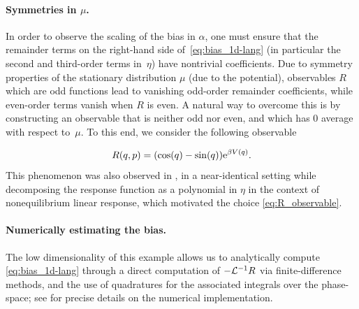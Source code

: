 %
\paragraph{Symmetries in $\mu$.}   In order to observe the scaling of the bias in $\alpha$, one must ensure that the remainder terms on the right-hand side of~\eqref{eq:bias_1d-lang} (in particular the second and third-order terms in~$\eta$) have nontrivial coefficients. Due to symmetry properties of the stationary distribution $\mu$ (due to the potential), observables $R$ which are odd functions lead to vanishing odd-order remainder coefficients, while even-order terms vanish when $R$ is even. A natural way to overcome this is by constructing an observable that is neither odd nor even, and which has 0 average with respect to~$\mu$. To this end, we consider the following observable

\begin{equation}
	R(q,p) = \paren*{\cos(q) - \sin(q)} \e^{\beta V(q)}.
	\label{eq:R_observable}
\end{equation}
%
This phenomenon was also observed in \cite[Section 4.2]{synthetic2023}, in a near-identical setting while decomposing the response function as a polynomial in $\eta$ in the context of nonequilibrium linear response, which motivated the choice \eqref{eq:R_observable}.

\paragraph{Numerically estimating the bias.} The low dimensionality of this example allows us to analytically compute \eqref{eq:bias_1d-lang} through a direct computation of $-\mathcal{L}^{-1}R$ via finite-difference methods, and the use of quadratures for the associated integrals over the phase-space; see   for precise details on the numerical implementation.

